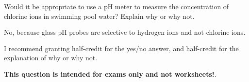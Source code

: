 

Would it be appropriate to use a pH meter to measure the concentration of chlorine ions in swimming pool water?  Explain why or why not.







No, because glass pH probes are selective to hydrogen ions and not chlorine ions.

\vskip 10pt

I recommend granting half-credit for the yes/no answer, and half-credit for the explanation of why or why not.







{\bf This question is intended for exams only and not worksheets!}.



